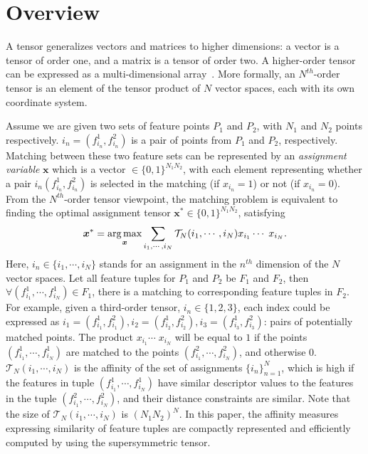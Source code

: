\section{Overview}
\label{sec:overview}

A tensor generalizes vectors and matrices to higher dimensions: a vector is a tensor of order one,
and a matrix is a tensor of order two. A higher-order tensor can be expressed as a multi-dimensional array~\cite{Kolda08}.
More formally, an $N^{th}$-order tensor is an element of the tensor product of $N$ vector spaces, each with its own coordinate system.

Assume we are given two sets of feature points $P_1$ and $P_2$, with $N_1$ and $N_2$ points respectively.
$i_n = (f^1_{i_n}, f^2_{i_n})$ is a pair of points from $P_1$ and $P_2$, respectively.
Matching between these two feature sets can be represented by an \emph{assignment variable} $\boldsymbol{x}$ which is a vector $\in \{0,1\}^{N_1 N_2}$, with each element representing
whether a pair $i_n(f^1_{i_n}, f^2_{i_n})$ is selected in the matching (if $x_{i_n} = 1$) or not (if $x_{i_n} = 0$).
From the $N^{th}$-order tensor viewpoint,
the matching problem is equivalent to finding the optimal assignment tensor ${\boldsymbol{x}}^*
 \in \{0,1\}^{N_1 N_2}$, satisfying~\cite{Kolda08}
\begin{equation}
\label{equ:assigment}
  {\boldsymbol{x}}^* = \argmax_{\boldsymbol{x}}  \sum_{i_1,\cdots,i_N} \mathcal{T}_N(i_1,\cdots,i_N) x_{i_1}  \cdots\; x_{i_N}.
\end{equation}
Here, $i_n \in \{i_1,\cdots ,i_N\}$ stands for an assignment in the $n^{th}$ dimension of the $N$ vector spaces.
Let all feature tuples for $P_1$ and $P_2$ be $F_1$ and $F_2$, then $\forall (f_{i_1}^1, \cdots, f_{i_N}^1)\in F_1$,
there is a matching to corresponding feature tuples in $F_2$.
For example, given a third-order tensor, $i_n \in \{1,2,3\}$,
each index could be expressed as $i_1=(f_{i_1}^1,f_{i_1}^2), i_2=(f_{i_2}^1,f_{i_2}^2), i_3=(f_{i_3}^1,f_{i_3}^2)$: pairs of potentially matched points.
The product $x_{i_1} \cdots\;x_{i_N}$ will be equal to $1$ if the points $(f_{i_1}^1, \cdots, f_{i_N}^1)$ are matched to the points $(f_{i_1}^2, \cdots, f_{i_N}^2)$,
and otherwise 0.
$\mathcal{T}_N(i_1,\cdots,i_N)$ is the affinity of the set of assignments $\{i_n\}_{n=1}^N$,
which is high if the features in tuple $(f_{i_1}^1, \cdots, f_{i_N}^1)$  have similar descriptor values to the features in the tuple $(f_{i_1}^2, \cdots, f_{i_N}^2)$,
and their distance constraints are similar.
Note that the size of $\mathcal{T}_N(i_1,\cdots,i_N)$ is ${(N_1N_2)}^N$.
In this paper, the affinity measures expressing similarity of feature tuples are compactly represented and efficiently computed by using the supersymmetric tensor.

